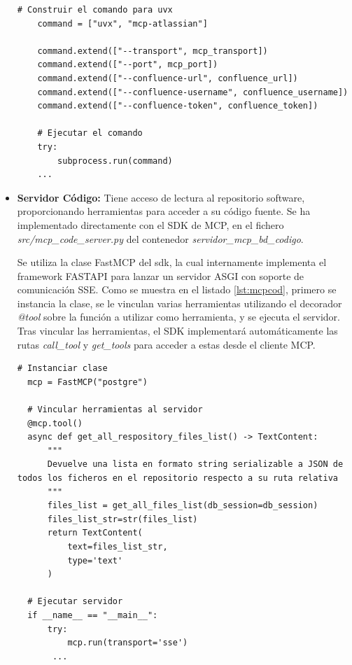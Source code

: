 \begin{itemize}
\begin{lstlisting}[caption={Ejecución del lanzamiento de servidor MCP Confluence con uvx},label={lst:check_data}]
    # Construir el comando para uvx
    command = ["uvx", "mcp-atlassian"]
    
    command.extend(["--transport", mcp_transport])
    command.extend(["--port", mcp_port]) 
    command.extend(["--confluence-url", confluence_url])
    command.extend(["--confluence-username", confluence_username])
    command.extend(["--confluence-token", confluence_token])

    # Ejecutar el comando
    try:
        subprocess.run(command)
    ...
\end{lstlisting}

\item\textbf{Servidor Código: }Tiene acceso de lectura al repositorio software, proporcionando herramientas para acceder a su código fuente. Se ha implementado directamente con el SDK de MCP, en el fichero \textit{src/mcp\_code\_server.py} del contenedor \textit{servidor\_mcp\_bd\_codigo}. 

  Se utiliza la clase FastMCP del sdk, la cual internamente implementa el framework FASTAPI para lanzar un servidor ASGI con soporte de comunicación SSE. Como se muestra en el listado \ref{lst:mcpcod}, primero se instancia la clase, se le vinculan varias herramientas utilizando el decorador \textit{@tool} sobre la función a utilizar como herramienta, y se ejecuta el servidor. Tras vincular las herramientas, el SDK implementará automáticamente las rutas \textit{call\_tool} y \textit{get\_tools} para acceder a estas desde el cliente MCP.

\begin{lstlisting}[caption={Implementación de servidor MCP con SDK de python},label={lst:mcpcod}]
  # Instanciar clase 
  mcp = FastMCP("postgre")

  # Vincular herramientas al servidor
  @mcp.tool()
  async def get_all_respository_files_list() -> TextContent:
      """
      Devuelve una lista en formato string serializable a JSON de todos los ficheros en el repositorio respecto a su ruta relativa
      """
      files_list = get_all_files_list(db_session=db_session)
      files_list_str=str(files_list)
      return TextContent(
          text=files_list_str,
          type='text'
      )

  # Ejecutar servidor
  if __name__ == "__main__":
      try:
          mcp.run(transport='sse')
       ...

\end{lstlisting}


\end{itemize}

